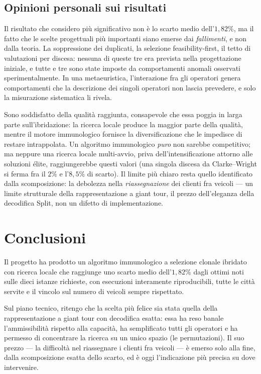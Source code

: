 \documentclass[10pt,a4paper]{article}
\begin{document}
\subsection{Opinioni personali sui risultati}

Il risultato che considero più significativo non è lo scarto medio dell'$1{,}82\%$,
ma il fatto che le scelte progettuali più importanti siano emerse dai
\emph{fallimenti}, e non dalla teoria. La soppressione dei duplicati, la selezione
feasibility-first, il tetto di valutazioni per discesa: nessuna di queste tre era
prevista nella progettazione iniziale, e tutte e tre sono state imposte da
comportamenti anomali osservati sperimentalmente. In una metaeuristica, l'interazione fra gli
operatori genera comportamenti che la descrizione dei singoli operatori non lascia
prevedere, e solo la misurazione sistematica li rivela.

Sono soddisfatto della qualità raggiunta, consapevole che essa poggia in larga
parte sull'ibridazione: la ricerca locale produce la maggior parte della qualità,
mentre il motore immunologico fornisce la diversificazione che le impedisce di
restare intrappolata. Un algoritmo immunologico \emph{puro} non sarebbe
competitivo; ma neppure una ricerca locale multi-avvio, priva
dell'intensificazione attorno alle soluzioni élite, raggiungerebbe questi valori
(una singola discesa da Clarke--Wright si ferma fra il $2\%$ e l'$8{,}5\%$ di
scarto). Il limite più chiaro resta quello identificato dalla scomposizione: la
debolezza nella \emph{riassegnazione} dei clienti fra veicoli --- un limite
strutturale della rappresentazione a giant tour, il prezzo dell'eleganza della
decodifica Split, non un difetto di implementazione.

\section{Conclusioni}
\label{sec:conclusioni}

Il progetto ha prodotto un algoritmo immunologico a selezione clonale ibridato
con ricerca locale che raggiunge uno scarto medio dell'$1{,}82\%$ dagli ottimi
noti sulle dieci istanze richieste, con esecuzioni interamente riproducibili,
tutte le città servite e il vincolo sul numero di veicoli sempre rispettato.

Sul piano tecnico, ritengo che la scelta più felice sia stata quella della
rappresentazione a giant tour con decodifica esatta: essa ha reso banale
l'ammissibilità rispetto alla capacità, ha semplificato tutti gli operatori e ha
permesso di concentrare la ricerca su un unico spazio (le permutazioni). Il suo
prezzo --- la difficoltà nel riassegnare i clienti fra veicoli --- è emerso solo
alla fine, dalla scomposizione esatta dello scarto, ed è oggi l'indicazione più
precisa su dove intervenire.
\end{document}
